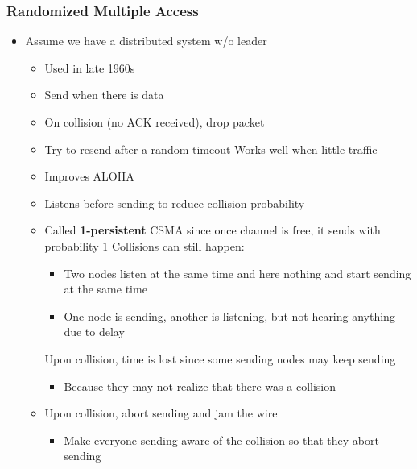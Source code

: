 \subsubsection{Randomized Multiple Access}
\begin{itemize}
    \item Assume we have a distributed system w/o leader
        \begin{itemize}
            \item Used in late 1960s
            \item Send when there is data
            \item On collision (no ACK received), drop packet
            \item Try to resend after a random timeout
            \ipro Works well when little traffic
        \end{itemize}
        \begin{itemize}
            \item Improves ALOHA
            \item Listens before sending to reduce collision probability
            \item Called \textbf{1-persistent} CSMA since once channel is free, it sends with probability $1$
            \icon Collisions can still happen:
                \begin{itemize}
                    \item Two nodes listen at the same time and here nothing and start sending at the same time
                    \item One node is sending, another is listening, but not hearing anything due to delay
                \end{itemize}
            \icon Upon collision, time is lost since some sending nodes may keep sending
                \begin{itemize}
                    \item Because they may not realize that there was a collision
                \end{itemize}
        \end{itemize}
        \begin{itemize}
            \item Upon collision, abort sending and jam the wire
                \begin{itemize}
                    \item Make everyone sending aware of the collision so that they abort sending \end{itemize}

\end{itemize}
\end{itemize}
